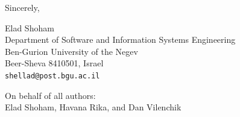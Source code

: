 \documentclass[11pt]{article}
\begin{document}
\vspace{2em}

\noindent
Sincerely,

\vspace{1.5em}

\noindent
Elad Shoham\\
Department of Software and Information Systems Engineering\\
Ben-Gurion University of the Negev\\
Beer-Sheva 8410501, Israel\\
\texttt{shellad@post.bgu.ac.il}

\vspace{1em}

\noindent
On behalf of all authors:\\
Elad Shoham, Havana Rika, and Dan Vilenchik
\end{document}
